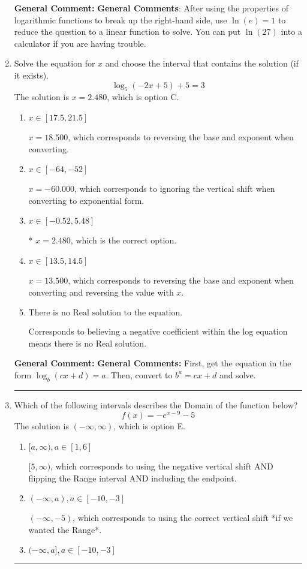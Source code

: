 \documentclass{extbook}[14pt]
\newcommand{\litem}[1]{\item #1

\rule{\textwidth}{0.4pt}}
\begin{document}
\begin{enumerate}
{\textbf{General Comment:} \textbf{General Comments}: After using the properties of logarithmic functions to break up the right-hand side, use $\ln(e) = 1$ to reduce the question to a linear function to solve. You can put $\ln(27)$ into a calculator if you are having trouble.
}
\litem{
Solve the equation for $x$ and choose the interval that contains the solution (if it exists).
\[ \log_{5}{(-2x+5)}+5 = 3 \]The solution is \( x = 2.480 \), which is option C.\begin{enumerate}[label=\Alph*.]
\item \( x \in [17.5, 21.5] \)

$x = 18.500$, which corresponds to reversing the base and exponent when converting.
\item \( x \in [-64, -52] \)

$x = -60.000$, which corresponds to ignoring the vertical shift when converting to exponential form.
\item \( x \in [-0.52, 5.48] \)

* $x = 2.480$, which is the correct option.
\item \( x \in [13.5, 14.5] \)

$x = 13.500$, which corresponds to reversing the base and exponent when converting and reversing the value with $x$.
\item \( \text{There is no Real solution to the equation.} \)

Corresponds to believing a negative coefficient within the log equation means there is no Real solution.
\end{enumerate}

\textbf{General Comment:} \textbf{General Comments:} First, get the equation in the form $\log_b{(cx+d)} = a$. Then, convert to $b^a = cx+d$ and solve.
}
\litem{
Which of the following intervals describes the Domain of the function below?
\[ f(x) = -e^{x-9}-5 \]The solution is \( (-\infty, \infty) \), which is option E.\begin{enumerate}[label=\Alph*.]
\item \( [a, \infty), a \in [1, 6] \)

$[5, \infty)$, which corresponds to using the negative vertical shift AND flipping the Range interval AND including the endpoint.
\item \( (-\infty, a), a \in [-10, -3] \)

$(-\infty, -5)$, which corresponds to using the correct vertical shift *if we wanted the Range*.
\item \( (-\infty, a], a \in [-10, -3] \)


\end{enumerate}}
\end{enumerate}
\end{document}
